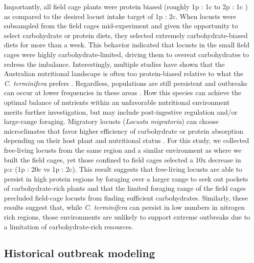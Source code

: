 \documentclass[
]{article}
\begin{document}
Importantly, all field cage plants were protein biased (roughly 1p : 1c
to 2p : 1c ) as compared to the desired locust intake target of 1p : 2c.
When locusts were subsampled from the field cages mid-experiment and
given the opportunity to select carbohydrate or protein diets, they
selected extremely carbohydrate-biased diets for more than a week. This
behavior indicated that locusts in the small field cages were highly
carbohydrate-limited, driving them to overeat carbohydrates to redress
the imbalance. Interestingly, multiple studies have shown that the
Australian nutritional landscape is often too protein-biased relative to
what the \emph{C. terminifera} prefers
\citep{lawton_woody_2020, lawton_mismatched_2021}. Regardless,
populations are still persistent and outbreaks can occur at lower
frequencies in these areas
\citep{deveson_satellite_2013, key_general_1945}. How this species can
achieve the optimal balance of nutrients within an unfavorable
nutritional environment merits further investigation, but may include
post-ingestive regulation and/or large-range foraging. Migratory locusts
(\emph{Locusta migratoria}) can choose microclimates that favor higher
efficiency of carbohydrate or protein absorption depending on their host
plant and nutritional status \citep{clissold_insect_2013}. For this
study, we collected free-living locusts from the same region and a
similar environment as where we built the field cages, yet those
confined to field cages selected a 10x decrease in p:c (1p : 20c vs 1p :
2c). This result suggests that free-living locusts are able to persist
in high protein regions by foraging over a larger range to seek out
pockets of carbohydrate-rich plants and that the limited foraging range
of the field cages precluded field-cage locusts from finding sufficient
carbohydrates. Similarly, these results suggest that, while \emph{C.
terminifera} can persist in low numbers in nitrogen rich regions, those
environments are unlikely to support extreme outbreaks due to a
limitation of carbohydrate-rich resources.

\subsection{Historical outbreak
modeling}\label{historical-outbreak-modeling}
\end{document}

